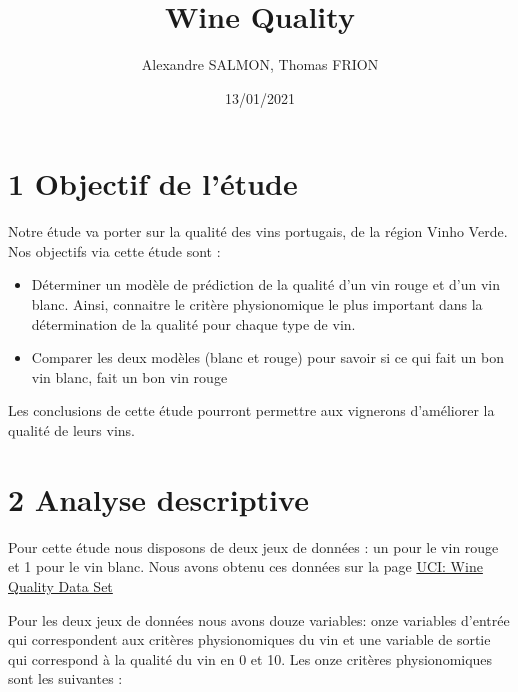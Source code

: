 \documentclass[
]{article}
\title{Wine Quality}
\author{Alexandre SALMON, Thomas FRION}
\date{13/01/2021}
\providecommand{\tightlist}{%
  \setlength{\itemsep}{0pt}\setlength{\parskip}{0pt}}
\begin{document}
\maketitle

\hypertarget{objectif-de-luxe9tude}{%
\section{1 Objectif de l'étude}\label{objectif-de-luxe9tude}}

Notre étude va porter sur la qualité des vins portugais, de la région
Vinho Verde. Nos objectifs via cette étude sont :

\begin{itemize}
\tightlist
\item
  Déterminer un modèle de prédiction de la qualité d'un vin rouge et
  d'un vin blanc. Ainsi, connaitre le critère physionomique le plus
  important dans la détermination de la qualité pour chaque type de vin.
\item
  Comparer les deux modèles (blanc et rouge) pour savoir si ce qui fait
  un bon vin blanc, fait un bon vin rouge
\end{itemize}

Les conclusions de cette étude pourront permettre aux vignerons
d'améliorer la qualité de leurs vins.

\hypertarget{analyse-descriptive}{%
\section{2 Analyse descriptive}\label{analyse-descriptive}}

Pour cette étude nous disposons de deux jeux de données : un pour le vin
rouge et 1 pour le vin blanc. Nous avons obtenu ces données sur la page
\href{https://archive.ics.uci.edu/ml/datasets/Wine+Quality}{UCI: Wine
Quality Data Set}

Pour les deux jeux de données nous avons douze variables: onze variables
d'entrée qui correspondent aux critères physionomiques du vin et une
variable de sortie qui correspond à la qualité du vin en 0 et 10. Les
onze critères physionomiques sont les suivantes :
\end{document}
